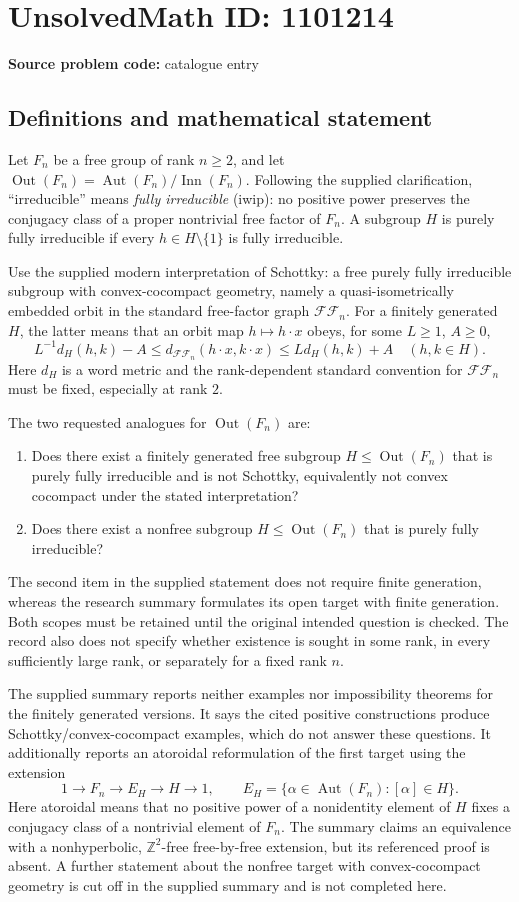 \documentclass[11pt]{article}
\newcommand{\Z}{\mathbb{Z}}
\begin{document}
\section*{UnsolvedMath ID: 1101214}
\textbf{Source problem code:} catalogue entry
\subsection{Definitions and mathematical statement}
Let $F_n$ be a free group of rank $n\geq2$, and let $\operatorname{Out}(F_n)=\operatorname{Aut}(F_n)/\operatorname{Inn}(F_n)$. Following the supplied clarification, ``irreducible'' means \emph{fully irreducible} (iwip): no positive power preserves the conjugacy class of a proper nontrivial free factor of $F_n$. A subgroup $H$ is purely fully irreducible if every $h\in H\setminus\{1\}$ is fully irreducible.

Use the supplied modern interpretation of Schottky: a free purely fully irreducible subgroup with convex-cocompact geometry, namely a quasi-isometrically embedded orbit in the standard free-factor graph $\mathcal{FF}_n$. For a finitely generated $H$, the latter means that an orbit map $h\mapsto h\cdot x$ obeys, for some $L\geq1$, $A\geq0$,
\[
L^{-1}d_H(h,k)-A\leq d_{\mathcal{FF}_n}(h\cdot x,k\cdot x)
\leq Ld_H(h,k)+A
\quad(h,k\in H).
\]
Here $d_H$ is a word metric and the rank-dependent standard convention for $\mathcal{FF}_n$ must be fixed, especially at rank $2$.

The two requested analogues for $\operatorname{Out}(F_n)$ are:
\begin{enumerate}
\item Does there exist a finitely generated free subgroup $H\leq\operatorname{Out}(F_n)$ that is purely fully irreducible and is not Schottky, equivalently not convex cocompact under the stated interpretation?
\item Does there exist a nonfree subgroup $H\leq\operatorname{Out}(F_n)$ that is purely fully irreducible?
\end{enumerate}
The second item in the supplied statement does not require finite generation, whereas the research summary formulates its open target with finite generation. Both scopes must be retained until the original intended question is checked. The record also does not specify whether existence is sought in some rank, in every sufficiently large rank, or separately for a fixed rank $n$.

The supplied summary reports neither examples nor impossibility theorems for the finitely generated versions. It says the cited positive constructions produce Schottky/convex-cocompact examples, which do not answer these questions. It additionally reports an atoroidal reformulation of the first target using the extension
\[
1\longrightarrow F_n\longrightarrow E_H\longrightarrow H\longrightarrow1,
\qquad E_H=\{\alpha\in\operatorname{Aut}(F_n):[\alpha]\in H\}.
\]
Here atoroidal means that no positive power of a nonidentity element of $H$ fixes a conjugacy class of a nontrivial element of $F_n$. The summary claims an equivalence with a nonhyperbolic, $\Z^2$-free free-by-free extension, but its referenced proof is absent. A further statement about the nonfree target with convex-cocompact geometry is cut off in the supplied summary and is not completed here.
\end{document}
